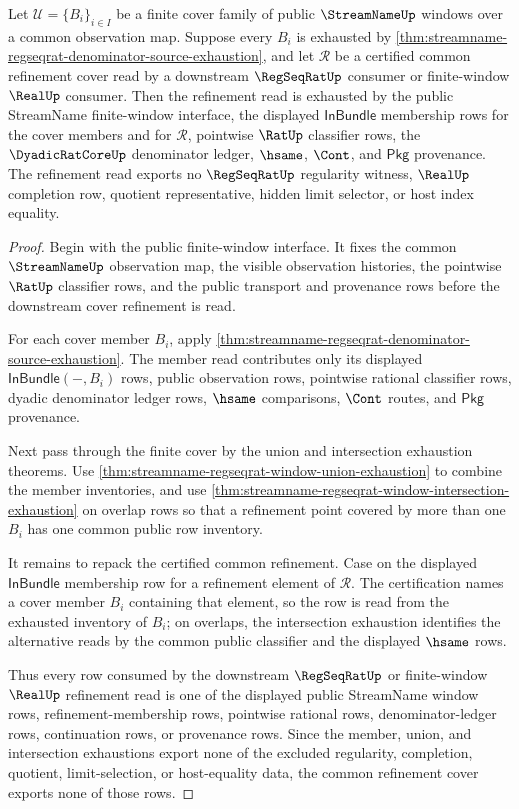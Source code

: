 \begin{theorem}
\label{thm:streamname-regseqrat-cover-refinement-exhaustion}
Let $\mathcal{U}=\{B_i\}_{i\in I}$ be a finite cover family of public
$\StreamNameUp$ windows over a common observation map. Suppose every $B_i$ is
exhausted by
\autoref{thm:streamname-regseqrat-denominator-source-exhaustion}, and let
$\mathcal{R}$ be a certified common refinement cover read by a downstream
$\RegSeqRatUp$ consumer or finite-window $\RealUp$ consumer. Then the
refinement read is exhausted by the public StreamName finite-window interface,
the displayed $\mathsf{InBundle}$ membership rows for the cover members and
for $\mathcal{R}$, pointwise $\RatUp$ classifier rows, the
$\DyadicRatCoreUp$ denominator ledger, $\hsame$, $\Cont$, and $\mathsf{Pkg}$
provenance. The refinement read exports no $\RegSeqRatUp$ regularity witness,
$\RealUp$ completion row, quotient representative, hidden limit selector, or
host index equality.
\end{theorem}
\begin{proof}
Begin with the public finite-window interface. It fixes the common
$\StreamNameUp$ observation map, the visible observation histories, the
pointwise $\RatUp$ classifier rows, and the public transport and provenance
rows before the downstream cover refinement is read.

For each cover member $B_i$, apply
\autoref{thm:streamname-regseqrat-denominator-source-exhaustion}. The member
read contributes only its displayed $\mathsf{InBundle}(-,B_i)$ rows, public
observation rows, pointwise rational classifier rows, dyadic denominator
ledger rows, $\hsame$ comparisons, $\Cont$ routes, and $\mathsf{Pkg}$
provenance.

Next pass through the finite cover by the union and intersection exhaustion
theorems. Use
\autoref{thm:streamname-regseqrat-window-union-exhaustion} to combine the
member inventories, and use
\autoref{thm:streamname-regseqrat-window-intersection-exhaustion} on overlap
rows so that a refinement point covered by more than one $B_i$ has one common
public row inventory.

It remains to repack the certified common refinement. Case on the displayed
$\mathsf{InBundle}$ membership row for a refinement element of
$\mathcal{R}$. The certification names a cover member $B_i$ containing that
element, so the row is read from the exhausted inventory of $B_i$; on overlaps,
the intersection exhaustion identifies the alternative reads by the common
public classifier and the displayed $\hsame$ rows.

Thus every row consumed by the downstream $\RegSeqRatUp$ or finite-window
$\RealUp$ refinement read is one of the displayed public StreamName window
rows, refinement-membership rows, pointwise rational rows, denominator-ledger
rows, continuation rows, or provenance rows. Since the member, union, and
intersection exhaustions export none of the excluded regularity, completion,
quotient, limit-selection, or host-equality data, the common refinement cover
exports none of those rows.
\end{proof}

